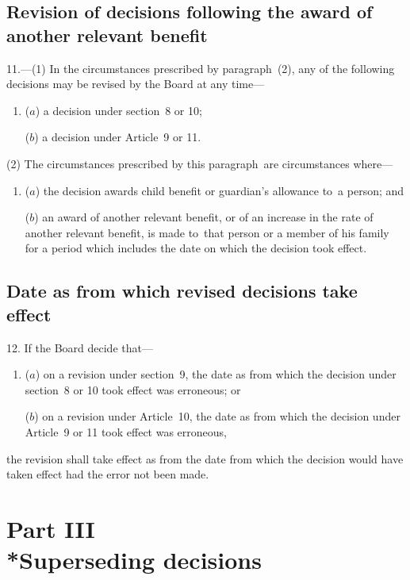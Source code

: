 \documentclass[12pt,a4paper]{article}
\begin{document}
\subsection[11. Revision of decisions following the award of another relevant benefit]{Revision of decisions following the award of another relevant benefit}

11.---(1)  In the circumstances prescribed by paragraph~(2), any of the following decisions may be revised by the Board at any time—
\begin{enumerate}\item[]
($a$) a decision under section~8 or 10;

($b$) a decision under Article~9 or 11.
\end{enumerate}

(2) The circumstances prescribed by this paragraph~are circumstances where—
\begin{enumerate}\item[]
($a$) the decision awards child benefit or guardian’s allowance to~a person; and

($b$) an award of another relevant benefit, or of an increase in the rate of another relevant benefit, is made to~that person or a member of his family for a period which includes the date on which the decision took effect.
\end{enumerate}

\subsection[12. Date as from which revised decisions take effect]{Date as from which revised decisions take effect}

12.  If the Board decide that—
\begin{enumerate}\item[]
($a$) on a revision under section~9, the date as from which the decision under section~8 or 10 took effect was erroneous; or

($b$) on a revision under Article~10, the date as from which the decision under Article~9 or 11 took effect was erroneous,
\end{enumerate}
the revision shall take effect as from the date from which the decision would have taken effect had the error not been made.

\section[Part III --- Superseding decisions]{Part III\\*Superseding decisions}
\end{document}
